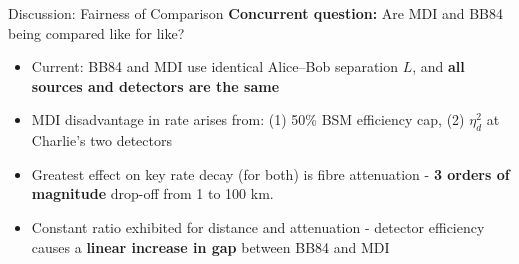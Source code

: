 \documentclass[10pt]{beamer}
\begin{document}
\begin{frame}{Discussion: Fairness of Comparison}
    \vspace{0.3cm}
    \textbf{Concurrent question:} Are MDI and BB84 being compared like for like?
 
    \begin{center}
    \end{center}
    \vspace{0.2cm}
    \begin{itemize}
        \item Current: BB84 and MDI use identical Alice--Bob separation $L$, and \textbf{all sources and detectors are the same}
        \item MDI disadvantage in rate arises from: (1) 50\% BSM efficiency cap, (2) $\eta_d^2$ at Charlie's two detectors
        \item Greatest effect on key rate decay (for both) is fibre attenuation - \textbf{3 orders of magnitude} drop-off from 1 to 100 km.
        \item Constant ratio exhibited for distance and attenuation - detector efficiency causes a \textbf{linear increase in gap} between BB84 and MDI
    \end{itemize}
\end{frame}
 
\end{document}
